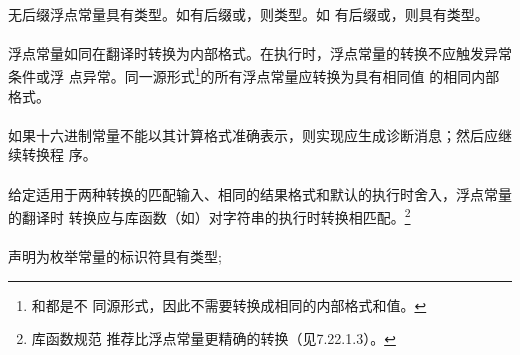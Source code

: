 {\paragraph{}
无后缀浮点常量具有类型。如有后缀或，则类型。如
有后缀或，则具有类型。

\paragraph{}
浮点常量如同在翻译时转换为内部格式。在执行时，浮点常量的转换不应触发异常条件或浮
点异常。同一源形式\footnote{和都是不
同源形式，因此不需要转换成相同的内部格式和值。}的所有浮点常量应转换为具有相同值
的相同内部格式。

\recprac
\paragraph{}
如果十六进制常量不能以其计算格式准确表示，则实现应生成诊断消息；然后应继续转换程
序。

\paragraph{}
给定适用于两种转换的匹配输入、相同的结果格式和默认的执行时舍入，浮点常量的翻译时
转换应与库函数（如）对字符串的执行时转换相匹配。\footnote{库函数规范
推荐比浮点常量更精确的转换（见7.22.1.3）。}

\syntax
\paragraph{}

\semantic
\paragraph{}
声明为枚举常量的标识符具有类型;


\syntax
}

